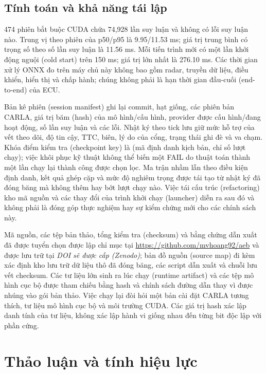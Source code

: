 \documentclass[11pt,a4paper]{article}
\newcommand{\artifactdoi}{\textit{DOI sẽ được cấp (Zenodo)}}
\begin{document}
\subsection{Tính toán và khả năng tái lập}
474 phiên bắt buộc CUDA chứa 74,928 lần suy luận và không có lỗi suy luận nào.
Trung vị theo phiên của p50/p95 là 9.95/11.53 ms; giá trị trung bình có trọng
số theo số lần suy luận là 11.56 ms. Mỗi tiến trình mới có một lần khởi động
nguội (cold start) trên 150 ms; giá trị lớn nhất là 276.10 ms. Các thời gian
xử lý ONNX đo trên máy chủ này không bao gồm radar, truyền dữ liệu, điều khiển,
hiển thị và chấp hành; chúng không phải là hạn thời gian đầu-cuối (end-to-end)
của ECU.

Bản kê phiên (session manifest) ghi lại commit, hạt giống, các phiên bản CARLA,
giá trị băm (hash) của mô hình/cấu hình, provider được cấu hình/đang hoạt
động, số lần suy luận và các lỗi. Nhật ký theo tick lưu giữ mức hỗ trợ của vết
theo dõi, độ tin cậy, TTC, biên, lý do của cổng, trạng thái ghi đè và va chạm.
Khóa điểm kiểm tra (checkpoint key) là (mã định danh kịch bản, chỉ số lượt
chạy); việc khôi phục kỹ thuật không thể biến một FAIL do thuật toán thành một
lần chạy lại thành công được chọn lọc. Ma trận nhầm lẫn theo điều kiện định
danh, kết quả ghép cặp và mức độ nghiêm trọng được tái tạo từ nhật ký đã đóng
băng mà không thêm hay bớt lượt chạy nào. Việc tái cấu trúc (refactoring) kho
mã nguồn và các thay đổi của trình khởi chạy (launcher) diễn ra sau đó và
không phải là đóng góp thực nghiệm hay sự kiểm chứng mới cho các chính sách
này.

Mã nguồn, các tệp bản thảo, tổng kiểm tra (checksum) và bằng chứng dẫn xuất đã
được tuyển chọn được lập chỉ mục tại \url{https://github.com/mvhoang92/aeb} và
được lưu trữ tại \artifactdoi; bản đồ nguồn (source map) đi kèm xác định kho
lưu trữ dữ liệu thô đã đóng băng, các script dẫn xuất và chuỗi lưu vết
checksum. Các tư liệu lớn sinh ra lúc chạy (runtime artifact) và các tệp mô
hình cục bộ được tham chiếu bằng hash và chính sách đường dẫn thay vì được
nhúng vào gói bản thảo. Việc chạy lại đòi hỏi một bản cài đặt CARLA tương
thích, tư liệu mô hình cục bộ và môi trường CUDA. Các giá trị hash xác lập danh
tính của tư liệu, không xác lập hành vi giống nhau đến từng bit độc lập với
phần cứng.

\section{Thảo luận và tính hiệu lực}
\end{document}
